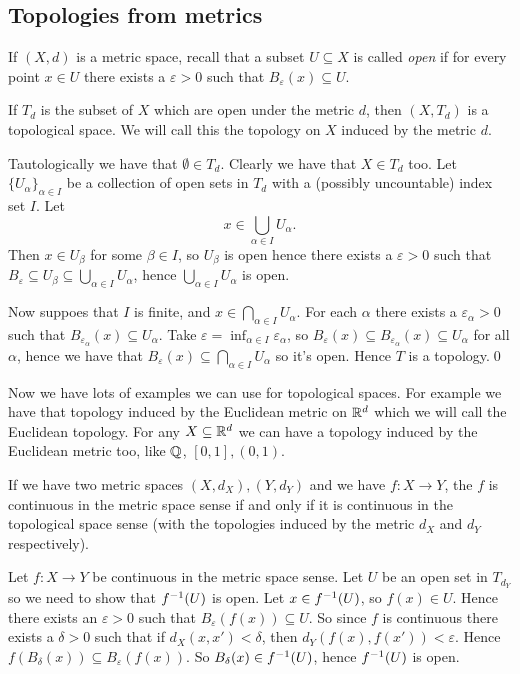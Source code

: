 \documentclass{article}
\begin{document}
\subsection{Topologies from metrics}
If $ (X,d) $ is a metric space, recall that a subset $ U\subseteq X $ is called \textit{open} if for every point $ x\in U $ there exists a $ \varepsilon>0 $ such that $ B_\varepsilon(x)\subseteq U $.
\begin{proposition}
  If $ T_d $ is the subset of $ X $ which are open under the metric $ d $, then $ (X,T_d) $ is a topological space. We will call this the topology on $ X $ induced by the metric $ d $.
\end{proposition}
\pf Tautologically we have that $ \emptyset \in T_d $. Clearly we have that $ X\in T_d $ too. Let $ \{U_\alpha\}_{\alpha\in I} $ be a collection of open sets in $ T_d $ with a (possibly uncountable) index set $ I $. Let
\[
	x\in\bigcup_{\alpha\in I}U_\alpha.
\]
Then $ x\in U_\beta $ for some $ \beta\in I $, so $ U_\beta $ is open hence there exists a $ \varepsilon>0 $ such that $ B_\varepsilon\subseteq U_\beta\subseteq \bigcup_{\alpha\in I}U_\alpha $, hence $ \bigcup_{\alpha\in I}U_\alpha $ is open.\par
Now suppoes that $ I $ is finite, and $ x\in \bigcap_{\alpha\in I}U_\alpha $. For each $ \alpha $ there exists a $ \varepsilon_\alpha>0 $ such that $ B_{\varepsilon_\alpha}(x)\subseteq U_\alpha $. Take $ \varepsilon=\inf_{\alpha\in I}\varepsilon_\alpha $, so $ B_\varepsilon(x)\subseteq B_{\varepsilon_\alpha}(x)\subseteq U_\alpha $ for all $ \alpha $, hence we have that $ B_\varepsilon(x) \subseteq \bigcap_{\alpha\in I}U_\alpha$ so it's open. Hence $ T $ is a topology.\qed
\par
Now we have lots of examples we can use for topological spaces. For example we have that topology induced by the Euclidean metric on $ \mathbb{R}^d $ which we will call the Euclidean topology. For any $ X\subseteq \mathbb{R}^d $ we can have a topology induced by the Euclidean metric too, like $ \mathbb{Q} $, $ [0,1], (0,1) $.
\begin{proposition}
  If we have two metric spaces $ (X,d_X), (Y,d_Y) $ and we have $ f:X\to Y $, the $ f $ is continuous in the metric space sense if and only if it is continuous in the topological space sense (with the topologies induced by the metric $ d_X $ and $ d_Y $ respectively).
\end{proposition}
\pf Let $ f:X\to Y $ be continuous in the metric space sense. Let $ U $ be an open set in $ T_{d_Y} $ so we need to show that $ {f}^{-1}(U) $ is open. Let $ x\in {f}^{-1}(U) $, so $ f(x)\in U $. Hence there exists an $ \varepsilon>0 $ such that $ B_\varepsilon(f(x))\subseteq U $. So since $ f $ is continuous there exists a $ \delta>0 $ such that if $ d_X(x,x')<\delta $, then $ d_Y(f(x),f(x'))<\varepsilon $. Hence $ f(B_\delta(x))\subseteq B_\varepsilon(f(x)) $. So $ B_\delta(x)\in {f}^{-1}(U) $, hence $ {f}^{-1}(U) $ is open.\par
\end{document}
